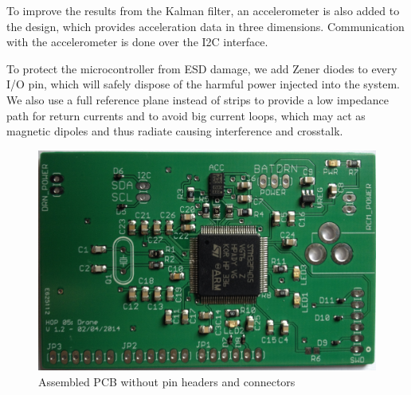 \documentclass[a4paper]{article}        %
\begin{document}
  To improve the results from the Kalman filter, an accelerometer is also added to the design, which provides acceleration data in three dimensions. Communication with the accelerometer is done over the I2C interface.

  To protect the microcontroller from ESD damage, we add Zener diodes to every I/O pin, which will safely dispose of the harmful power injected into the system.
  We also use a full reference plane instead of strips to provide a low impedance path for return currents and to avoid big current loops, which may act as magnetic dipoles and thus radiate causing interference and crosstalk.  
  
  \begin{figure}[H]
    \begin{center}
      \includegraphics[width=\textwidth]{images/final_pcb_result.eps}
      \caption{Assembled PCB without pin headers and connectors}
      \label{fig:final_pcb}
    \end{center}
  \end{figure}
  
\end{document}

